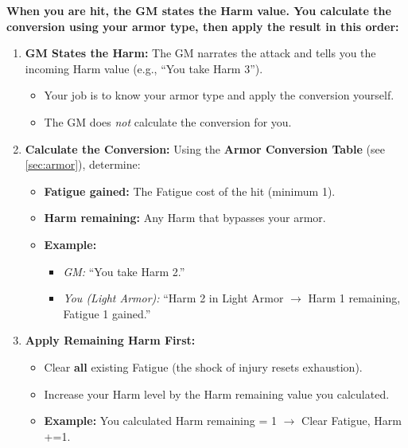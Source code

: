 \textbf{When you are hit, the GM states the Harm value. You calculate the conversion using your armor type, then apply the result in this order:}

\begin{enumerate}
  \item \textbf{GM States the Harm:} The GM narrates the attack and tells you the incoming Harm value (e.g., ``You take Harm 3'').
        \begin{itemize}
          \item Your job is to know your armor type and apply the conversion yourself.
          \item The GM does \textit{not} calculate the conversion for you.
        \end{itemize}

  \item \textbf{Calculate the Conversion:} Using the \textbf{Armor Conversion Table} (see \ref{sec:armor}), determine:
        \begin{itemize}
          \item \textbf{Fatigue gained:} The Fatigue cost of the hit (minimum 1).
          \item \textbf{Harm remaining:} Any Harm that bypasses your armor.
        \end{itemize}
        \begin{itemize}
          \item \textbf{Example:}
                \begin{itemize}
                  \item \textit{GM:} ``You take Harm 2.''
                  \item \textit{You (Light Armor):} ``Harm 2 in Light Armor $\to$ Harm 1 remaining, Fatigue 1 gained.''
                \end{itemize}
        \end{itemize}

  \item \textbf{Apply Remaining Harm First:}
        \begin{itemize}
          \item Clear \textbf{all} existing Fatigue (the shock of injury resets exhaustion).
          \item Increase your Harm level by the Harm remaining value you calculated.
        \end{itemize}
        \begin{itemize}
          \item \textbf{Example:} You calculated Harm remaining = 1 $\to$ Clear Fatigue, Harm +=1.
        \end{itemize}


\end{enumerate}
